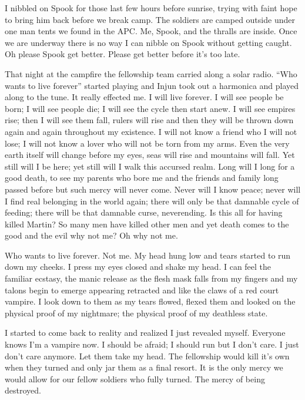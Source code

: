 I nibbled on Spook for those last few hours before sunrise, trying with faint hope to bring him back before we break camp. The soldiers are camped outside under one man tents we found in the APC. Me, Spook, and the thralls are inside. Once we are underway there is no way I can nibble on Spook without getting caught. Oh please Spook get better. Please get better before it's too late.

\Parsep


That night at the campfire the fellowship team carried along a solar radio. ``Who wants to live forever'' started playing and Injun took out a harmonica and played along to the tune. It really effected me. I will live forever. I will see people be born; I will see people die; I will see the cycle then start anew. I will see empires rise; then I will see them fall, rulers will rise and then they will be thrown down again and again throughout my existence. I will not know a friend who I will not lose; I will not know a lover who will not be torn from my arms. Even the very earth itself will change before my eyes, seas will rise and mountains will fall. Yet still will I be here; yet still will I walk this accursed realm. Long will I long for a good death, to see my parents who bore me and the friends and family long passed before but such mercy will never come. Never will I know peace; never will I find real belonging in the world again; there will only be that damnable cycle of feeding; there will be that damnable curse, neverending. Is this all for having killed Martin? So many men have killed other men and yet death comes to the good and the evil why not me? Oh why not me.

Who wants to live forever. Not me. My head hung low and tears started to run down my cheeks. I press my eyes closed and shake my head. I can feel the familiar ecstasy, the manic release as the flesh mask falls from my fingers and my talons begin to emerge appearing retracted and like the claws of a red court vampire. I look down to them as my tears flowed, flexed them and looked on the physical proof of my nightmare; the physical proof of my deathless state.

I started to come back to reality and realized I just revealed myself. Everyone knows I'm a vampire now. I should be afraid; I should run but I don't care. I just don't care anymore. Let them take my head. The fellowship would kill it's own when they turned and only jar them as a final resort. It is the only mercy we would allow for our fellow soldiers who fully turned. The mercy of being destroyed.














